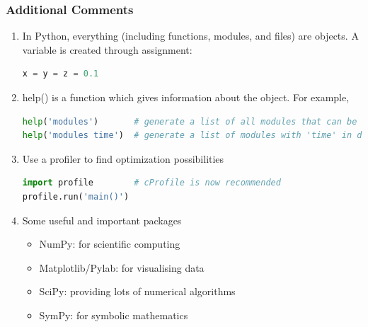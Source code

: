 
\begin{frame}[fragile]
	\MyLogo
	\frametitle{Additional Comments}  
	\small
	
\begin{enumerate}

\item In Python, everything (including functions, modules, and files) are objects. A variable is created through assignment:
\begin{lstlisting}[language=python,numbers=none] 
x = y = z = 0.1
\end{lstlisting}
				
\item help() is a function which gives information about the object. For example, 
\begin{lstlisting}[language=python,numbers=none] 
help('modules')       # generate a list of all modules that can be imported
help('modules time')  # generate a list of modules with 'time' in description
\end{lstlisting}
		
\item Use a profiler to find optimization possibilities
\begin{lstlisting}[language=python,numbers=none] 
import profile        # cProfile is now recommended
profile.run('main()')
\end{lstlisting}

\item Some useful and important packages
	\begin{itemize}\setlength\itemsep{0.25em}
	\item NumPy: for scientific computing
	\item Matplotlib/Pylab: for visualising data
	\item SciPy: providing lots of numerical algorithms
	\item SymPy: for symbolic mathematics
	\end{itemize}
		
\end{enumerate}


\end{frame}